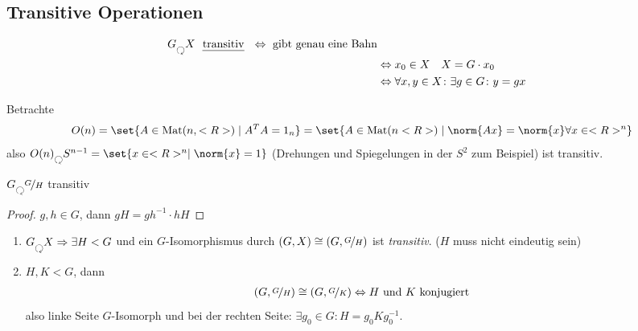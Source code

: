 \subsection*{Transitive Operationen}
\begin{definition}
	\begin{align*}
		G \Circlearrowleft X \text{ \begriff{transitiv} } \Leftrightarrow \text{ gibt genau eine Bahn}\\
		&\Leftrightarrow x_0 \in X\quad X = G \cdot x_0\\
		&\Leftrightarrow \forall x,y \in X\colon \exists g \in G \colon y = gx
	\end{align*}
\end{definition}
\begin{*example}
	Betrachte 
	\begin{align*}
		O(n) = \set{A \in \Mat(n,\R) \mid A^T A = 1_n} = \set{A \in \Mat(n\R)\mid \norm{Ax} = \norm{x} \forall x \in \R^n}
	\end{align*}
	also $O(n) \Circlearrowleft S^{n-1} = \set{x \in \R^n \mid \norm{x} = 1}$ (Drehungen und Spiegelungen in der $S^2$ zum Beispiel) ist transitiv.
\end{*example}
\begin{lemma}
	$G \Circlearrowleft \lnkset{G}{H}$ transitiv
\end{lemma}
\begin{proof}
	$g,h \in G$, dann $gH = gh^{-1}\cdot h H$
\end{proof}
\begin{theorem}
	\begin{enumerate}
		\item $G \Circlearrowleft X \implies \exists H < G$ und ein $G$-Isomorphismus durch $(G,X) \cong (G, \lnkset{G}{H})$ ist \emph{transitiv}. ($H$ muss nicht eindeutig sein)
		\item $H,K < G$, dann
		\begin{align*}
			(G, \lnkset{G}{H}) \cong (G, \lnkset{G}{K}) \Leftrightarrow H \und K \text{ konjugiert} 
		\end{align*}
		also linke Seite $G$-Isomorph und bei der rechten Seite: $\exists g_0 \in G\colon H = g_0 Kg_0^{-1}$.
	\end{enumerate}
\end{theorem}
